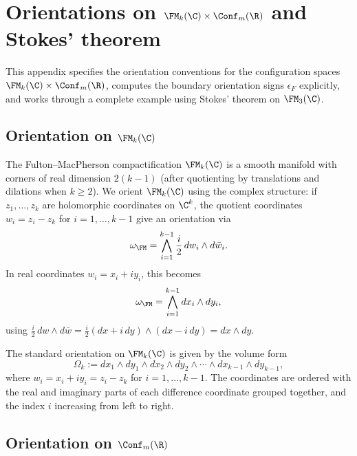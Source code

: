 \section{\texorpdfstring{Orientations on $\FM_k(\C)\times \Conf_m(\R)$ and Stokes' theorem}{Orientations on FM k(C) x Conf m(R) and Stokes' theorem}}
\label{app:orientations}

This appendix specifies the orientation conventions for the configuration spaces $\FM_k(\C) \times \Conf_m(\R)$, computes the boundary orientation signs $\epsilon_F$ explicitly, and works through a complete example using Stokes' theorem on $\FM_3(\C)$.

\subsection{\texorpdfstring{Orientation on $\FM_k(\C)$}{Orientation on FM k(C)}}
\label{subsec:orient-FM}

The Fulton--MacPherson compactification $\FM_k(\C)$ is a smooth manifold with corners of real dimension $2(k-1)$ (after quotienting by translations and dilations when $k \geq 2$). We orient $\FM_k(\C)$ using the complex structure: if $z_1,\ldots,z_k$ are holomorphic coordinates on $\C^k$, the quotient coordinates $w_i = z_i - z_k$ for $i=1,\ldots,k-1$ give an orientation via
\begin{equation}
\label{eq:orient-FM-form}
\omega_{\FM} = \bigwedge_{i=1}^{k-1} \frac{i}{2}\, dw_i \wedge d\bar{w}_i.
\end{equation}
In real coordinates $w_i = x_i + iy_i$, this becomes
\[
\omega_{\FM} = \bigwedge_{i=1}^{k-1} dx_i \wedge dy_i,
\]
using $\frac{i}{2}\,dw \wedge d\bar{w} = \frac{i}{2}(dx+i\,dy)\wedge(dx - i\,dy) = dx\wedge dy$.

\begin{convention}
\label{conv:coord-ordering}
The standard orientation on $\FM_k(\C)$ is given by the volume form
\begin{equation}
\label{eq:vol-FM}
\Omega_k := dx_1 \wedge dy_1 \wedge dx_2 \wedge dy_2 \wedge \cdots \wedge dx_{k-1}\wedge dy_{k-1},
\end{equation}
where $w_i = x_i + iy_i = z_i - z_k$ for $i = 1,\ldots,k-1$. The coordinates are ordered with the real and imaginary parts of each difference coordinate grouped together, and the index $i$ increasing from left to right.
\end{convention}

\subsection{\texorpdfstring{Orientation on $\Conf_m(\R)$}{Orientation on Conf m(R)}}

